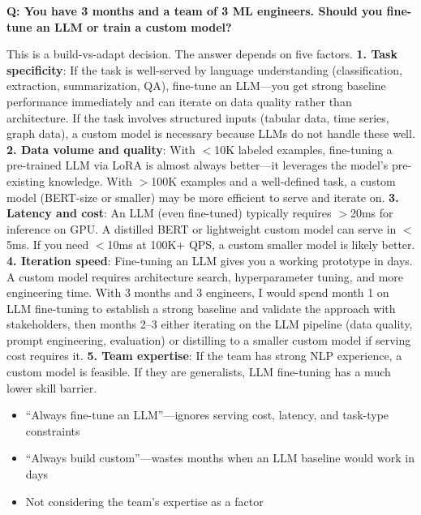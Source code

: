 \begin{interviewq}
\textbf{Q: You have 3 months and a team of 3 ML engineers. Should you fine-tune an LLM or train a custom model?}

 \quad {} \quad \badgefreq{\freqhigh}

\stronganswer This is a build-vs-adapt decision. The answer depends on five factors. \textbf{1. Task specificity}: If the task is well-served by language understanding (classification, extraction, summarization, QA), fine-tune an LLM---you get strong baseline performance immediately and can iterate on data quality rather than architecture. If the task involves structured inputs (tabular data, time series, graph data), a custom model is necessary because LLMs do not handle these well. \textbf{2. Data volume and quality}: With $<$10K labeled examples, fine-tuning a pre-trained LLM via LoRA is almost always better---it leverages the model's pre-existing knowledge. With $>$100K examples and a well-defined task, a custom model (BERT-size or smaller) may be more efficient to serve and iterate on. \textbf{3. Latency and cost}: An LLM (even fine-tuned) typically requires $>$20ms for inference on GPU. A distilled BERT or lightweight custom model can serve in $<$5ms. If you need $<$10ms at 100K+ QPS, a custom smaller model is likely better. \textbf{4. Iteration speed}: Fine-tuning an LLM gives you a working prototype in days. A custom model requires architecture search, hyperparameter tuning, and more engineering time. With 3 months and 3 engineers, I would spend month 1 on LLM fine-tuning to establish a strong baseline and validate the approach with stakeholders, then months 2--3 either iterating on the LLM pipeline (data quality, prompt engineering, evaluation) or distilling to a smaller custom model if serving cost requires it. \textbf{5. Team expertise}: If the team has strong NLP experience, a custom model is feasible. If they are generalists, LLM fine-tuning has a much lower skill barrier.

\redflags
\begin{itemize}
    \item ``Always fine-tune an LLM''---ignores serving cost, latency, and task-type constraints
    \item ``Always build custom''---wastes months when an LLM baseline would work in days
    \item Not considering the team's expertise as a factor
\end{itemize}


\end{interviewq}
